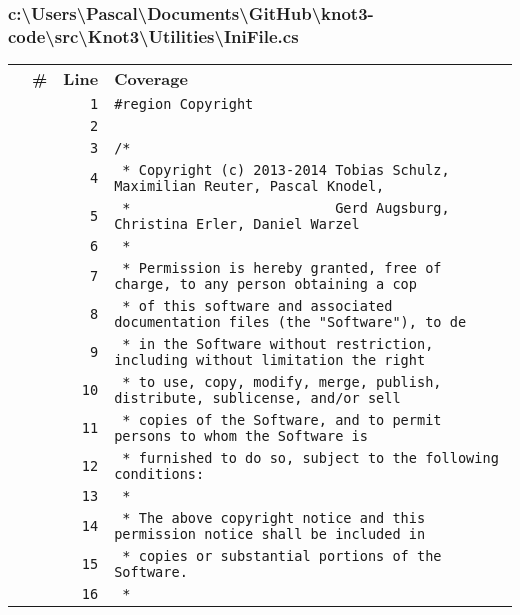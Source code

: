 \documentclass[a4paper,10pt]{article}
\begin{document}
\subsubsection{c:\textbackslash Users\textbackslash Pascal\textbackslash Documents\textbackslash GitHub\textbackslash knot3-code\textbackslash src\textbackslash Knot3\textbackslash Utilities\textbackslash IniFile.cs}
\begin{longtable}[l]{lrrl}
\textbf{} & \textbf{\#} & \textbf{Line} & \textbf{Coverage}\\
\cellcolor{gray} &  & \verb~1~ & \verb~#region Copyright~\\
\cellcolor{gray} &  & \verb~2~ & \verb~~\\
\cellcolor{gray} &  & \verb~3~ & \verb~/*~\\
\cellcolor{gray} &  & \verb~4~ & \verb~ * Copyright (c) 2013-2014 Tobias Schulz, Maximilian Reuter, Pascal Knodel,~\\
\cellcolor{gray} &  & \verb~5~ & \verb~ *                         Gerd Augsburg, Christina Erler, Daniel Warzel~\\
\cellcolor{gray} &  & \verb~6~ & \verb~ *~\\
\cellcolor{gray} &  & \verb~7~ & \verb~ * Permission is hereby granted, free of charge, to any person obtaining a cop~\\
\cellcolor{gray} &  & \verb~8~ & \verb~ * of this software and associated documentation files (the "Software"), to de~\\
\cellcolor{gray} &  & \verb~9~ & \verb~ * in the Software without restriction, including without limitation the right~\\
\cellcolor{gray} &  & \verb~10~ & \verb~ * to use, copy, modify, merge, publish, distribute, sublicense, and/or sell~\\
\cellcolor{gray} &  & \verb~11~ & \verb~ * copies of the Software, and to permit persons to whom the Software is~\\
\cellcolor{gray} &  & \verb~12~ & \verb~ * furnished to do so, subject to the following conditions:~\\
\cellcolor{gray} &  & \verb~13~ & \verb~ *~\\
\cellcolor{gray} &  & \verb~14~ & \verb~ * The above copyright notice and this permission notice shall be included in ~\\
\cellcolor{gray} &  & \verb~15~ & \verb~ * copies or substantial portions of the Software.~\\
\cellcolor{gray} &  & \verb~16~ & \verb~ *~\\

\end{longtable}
\end{document}
